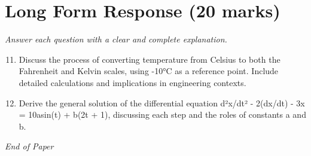 \documentclass[12pt]{article}
\begin{document}
\section*{Long Form Response (20 marks)}
\textit{Answer each question with a clear and complete explanation.}
\begin{enumerate}[label=\arabic*.]
\setcounter{enumi}{10}
\item Discuss the process of converting temperature from Celsius to both the Fahrenheit and
Kelvin scales, using -10°C as a reference point. Include detailed calculations and
implications in engineering contexts.
\item Derive the general solution of the differential equation d²x/dt² - 2(dx/dt) - 3x =
10asin(t) + b(2t + 1), discussing each step and the roles of constants a and b.
\end{enumerate}

\vfill
\noindent\textit{End of Paper}
\end{document}
